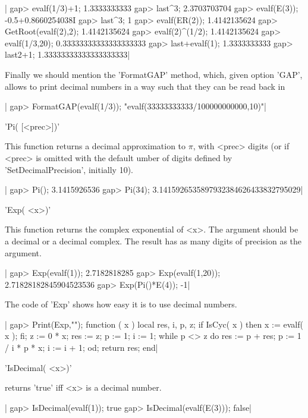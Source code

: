 |    gap> evalf(1/3)+1;
    1.3333333333
    gap> last^3;
    2.3703703704
    gap> evalf(E(3));
    -0.5+0.8660254038I
    gap> last^3;
    1
    gap> evalf(ER(2));
    1.4142135624
    gap> GetRoot(evalf(2),2);
    1.4142135624
    gap> evalf(2)^(1/2);
    1.4142135624
    gap> evalf(1/3,20);
    0.33333333333333333333
    gap> last+evalf(1);
    1.3333333333
    gap> last2+1;
    1.33333333333333333333|

Finally  we should mention the 'FormatGAP'  method, which, given option 'GAP',
allows  to print decimal numbers in  a way such that they  can be read back in
\GAP\:\

|    gap> FormatGAP(evalf(1/3));
    "evalf(33333333333/100000000000,10)"|

%
%

'Pi( [<prec>])'

This function  returns a  decimal approximation  to $\pi$,  with <prec>
digits  (or if  <prec>  is omitted  with the  default  umber of  digits
defined by 'SetDecimalPrecision', initially 10).

|    gap> Pi();
    3.1415926536
    gap> Pi(34);
    3.1415926535897932384626433832795029|

%
%

'Exp( <x>)'

This  function returns  the complex  exponential of  <x>. The  argument
should be a decimal or a decimal complex. The result has as many digits
of precision as the argument.

|    gap> Exp(evalf(1));
    2.7182818285
    gap> Exp(evalf(1,20));
    2.71828182845904523536
    gap> Exp(Pi()*E(4));
    -1|

The code of 'Exp' shows how easy it is to use decimal numbers.

|    gap> Print(Exp,"\n");
    function ( x )
        local  res, i, p, z;
        if IsCyc( x )  then
            x := evalf( x );
        fi;
        z := 0 * x;
        res := z;
        p := 1;
        i := 1;
        while p <> z  do
            res := p + res;
            p := 1 / i * p * x;
            i := i + 1;
        od;
        return res;
    end|

%
%

'IsDecimal( <x>)'

returns 'true' iff <x> is a decimal number.

|    gap> IsDecimal(evalf(1));
    true
    gap> IsDecimal(evalf(E(3)));
    false|

